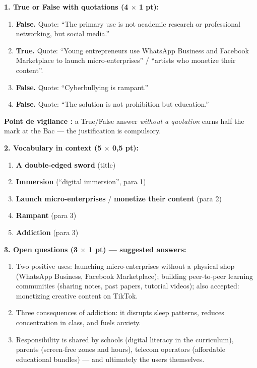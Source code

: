 \documentclass[11pt]{article}
\begin{document}
\begin{corrige}
\textbf{1. True or False with quotations (4 $\times$ 1 pt):}
\begin{enumerate}
\item \textbf{False.} Quote: ``The primary use is not academic research or professional networking, but social media.''
\item \textbf{True.} Quote: ``Young entrepreneurs use WhatsApp Business and Facebook Marketplace to launch micro-enterprises'' / ``artists who monetize their content''.
\item \textbf{False.} Quote: ``Cyberbullying is rampant.''
\item \textbf{False.} Quote: ``The solution is not prohibition but education.''
\end{enumerate}
\textbf{Point de vigilance :} a True/False answer \emph{without a quotation} earns half the mark at the Bac — the justification is compulsory.

\textbf{2. Vocabulary in context (5 $\times$ 0,5 pt):}
\begin{enumerate}
\item \textbf{A double-edged sword} (title)
\item \textbf{Immersion} (``digital immersion'', para 1)
\item \textbf{Launch micro-enterprises} / \textbf{monetize their content} (para 2)
\item \textbf{Rampant} (para 3)
\item \textbf{Addiction} (para 3)
\end{enumerate}

\textbf{3. Open questions (3 $\times$ 1 pt) — suggested answers:}
\begin{enumerate}
\item Two positive uses: launching micro-enterprises without a physical shop (WhatsApp Business, Facebook Marketplace); building peer-to-peer learning communities (sharing notes, past papers, tutorial videos); also accepted: monetizing creative content on TikTok.
\item Three consequences of addiction: it disrupts sleep patterns, reduces concentration in class, and fuels anxiety.
\item Responsibility is shared by schools (digital literacy in the curriculum), parents (screen-free zones and hours), telecom operators (affordable educational bundles) — and ultimately the users themselves.
\end{enumerate}


\end{corrige}
\end{document}
